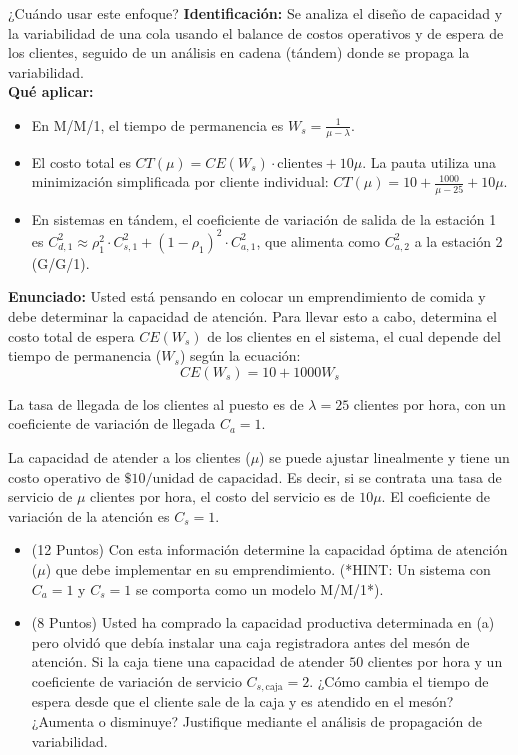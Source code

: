 \documentclass[11pt, a4paper]{article}
\begin{document}
  \begin{tipprueba}{¿Cuándo usar este enfoque?}
    \textbf{Identificación:} Se analiza el diseño de capacidad y la variabilidad de una cola usando el balance de costos operativos y de espera de los clientes, seguido de un análisis en cadena (tándem) donde se propaga la variabilidad.\\
    \textbf{Qué aplicar:}
    \begin{itemize}
      \item En M/M/1, el tiempo de permanencia es $W_s = \frac{1}{\mu - \lambda}$.
      \item El costo total es $CT(\mu) = CE(W_s) \cdot \text{clientes} + 10\mu$. La pauta utiliza una minimización simplificada por cliente individual: $CT(\mu) = 10 + \frac{1000}{\mu - 25} + 10\mu$.
      \item En sistemas en tándem, el coeficiente de variación de salida de la estación 1 es $C_{d,1}^2 \approx \rho_1^2 \cdot C_{s,1}^2 + (1-\rho_1)^2 \cdot C_{a,1}^2$, que alimenta como $C_{a,2}^2$ a la estación 2 (G/G/1).
    \end{itemize}
  \end{tipprueba}

  \textbf{Enunciado:}
  Usted está pensando en colocar un emprendimiento de comida y debe determinar la capacidad de atención. Para llevar esto a cabo, determina el costo total de espera $CE(W_s)$ de los clientes en el sistema, el cual depende del tiempo de permanencia ($W_s$) según la ecuación:
  \begin{equation*}
    CE(W_s) = 10 + 1000 W_s
  \end{equation*}

  La tasa de llegada de los clientes al puesto es de $\lambda = 25$ clientes por hora, con un coeficiente de variación de llegada $C_a = 1$. 

  La capacidad de atender a los clientes ($\mu$) se puede ajustar linealmente y tiene un costo operativo de $\$10/\text{unidad de capacidad}$. Es decir, si se contrata una tasa de servicio de $\mu$ clientes por hora, el costo del servicio es de $10\mu$. El coeficiente de variación de la atención es $C_s = 1$.

  \begin{itemize}
    \item[\textbf{a)}] (12 Puntos) Con esta información determine la capacidad óptima de atención ($\mu$) que debe implementar en su emprendimiento. (*HINT: Un sistema con $C_a=1$ y $C_s=1$ se comporta como un modelo M/M/1*).
    \item[\textbf{b)}] (8 Puntos) Usted ha comprado la capacidad productiva determinada en (a) pero olvidó que debía instalar una caja registradora antes del mesón de atención. Si la caja tiene una capacidad de atender $50$ clientes por hora y un coeficiente de variación de servicio $C_{s,\text{caja}} = 2$. ¿Cómo cambia el tiempo de espera desde que el cliente sale de la caja y es atendido en el mesón? ¿Aumenta o disminuye? Justifique mediante el análisis de propagación de variabilidad.
  \end{itemize}
\end{document}
